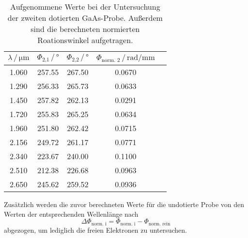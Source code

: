      \begin{table}[H]
       \centering
       \caption{Aufgenommene Werte bei der Untersuchung der zweiten dotierten GaAs-Probe. Außerdem sind die
       berechneten normierten Roationswinkel aufgetragen.}
       \label{tab:Probe2}
       \begin{tabular}{ccccc}
         \toprule
         $\lambda\, / \, \si{\micro\meter}$ & $\Phi_\text{2,1} \, / \, \si{\degree}$ & $\Phi_\text{2,2} \, / \, \si{\degree}$ & $\Phi_\text{norm. 2} \, / \, \si{\radian\per\milli\meter}$  \\
         \midrule
         \num{1.060} & \num{257.55} & \num{267.50} & \num{0.0670} \\
         \num{1.290} & \num{256.33} & \num{265.73} & \num{0.0633} \\
         \num{1.450} & \num{257.82} & \num{262.13} & \num{0.0291} \\
         \num{1.720} & \num{255.83} & \num{265.25} & \num{0.0634} \\
         \num{1.960} & \num{251.80} & \num{262.42} & \num{0.0715} \\
         \num{2.156} & \num{249.72} & \num{261.17} & \num{0.0771} \\
         \num{2.340} & \num{223.67} & \num{240.00} & \num{0.1100} \\
         \num{2.510} & \num{212.38} & \num{226.68} & \num{0.0963} \\
         \num{2.650} & \num{245.62} & \num{259.52} & \num{0.0936} \\
         \bottomrule
       \end{tabular}
       \end{table} \noindent
Zusätzlich werden die zuvor berechneten Werte für die undotierte Probe von den Werten der entsprechenden Wellenlänge nach
\begin{equation*}
 \Delta \Phi_\text{norm. i} = \Phi_\text{norm. i} - \Phi_\text{norm. rein}
\end{equation*}
abgezogen, um lediglich die freien Elektronen zu untersuchen.

